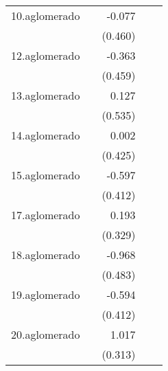 {\begin{longtable}{l*{4}{D{.}{.}{-1}}}
\addlinespace
10.aglomerado&                     &      -0.077         &                     &                     \\
            &                     &     (0.460)         &                     &                     \\
\addlinespace
12.aglomerado&                     &      -0.363         &                     &                     \\
            &                     &     (0.459)         &                     &                     \\
\addlinespace
13.aglomerado&                     &       0.127         &                     &                     \\
            &                     &     (0.535)         &                     &                     \\
\addlinespace
14.aglomerado&                     &       0.002         &                     &                     \\
            &                     &     (0.425)         &                     &                     \\
\addlinespace
15.aglomerado&                     &      -0.597         &                     &                     \\
            &                     &     (0.412)         &                     &                     \\
\addlinespace
17.aglomerado&                     &       0.193         &                     &                     \\
            &                     &     (0.329)         &                     &                     \\
\addlinespace
18.aglomerado&                     &      -0.968\sym{*}  &                     &                     \\
            &                     &     (0.483)         &                     &                     \\
\addlinespace
19.aglomerado&                     &      -0.594         &                     &                     \\
            &                     &     (0.412)         &                     &                     \\
\addlinespace
20.aglomerado&                     &       1.017\sym{**} &                     &                     \\
            &                     &     (0.313)         &                     &                     \\

\end{longtable}}
